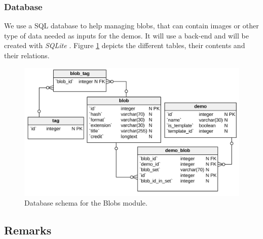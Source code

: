 \subsubsection{Database}

We use a SQL database to help managing blobs, that can contain images or other 
type of data needed as inputs for the demos.
It will use a back-end and will be created with \emph{SQLite} \cite{SQLite}.
Figure \ref{img:images_bdd} depicts the different tables, their contents and their
relations.

\begin{figure}[H]
  \centering
  \includegraphics[width=\textwidth]{blobs/images/images_bdd_vertabelo}
  \caption{Database schema for the Blobs module. }
  \label{img:images_bdd}
\end{figure}

\subsection{Remarks}
